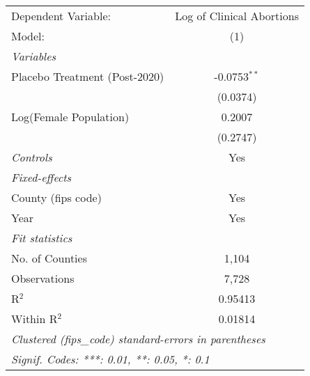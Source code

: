 \begingroup
\centering
\begin{tabular}{lc}
   \tabularnewline \midrule \midrule
   Dependent Variable:           & Log of Clinical Abortions\\   
   Model:                        & (1)\\  
   \midrule
   \emph{Variables}\\
   Placebo Treatment (Post-2020) & -0.0753$^{**}$\\   
                                 & (0.0374)\\   
   Log(Female Population)        & 0.2007\\   
                                 & (0.2747)\\   
   \midrule
   \emph{Controls}               & Yes\\
   \midrule
   \emph{Fixed-effects}\\
   County (fips code)            & Yes\\
   Year                          & Yes\\
   \midrule
   \emph{Fit statistics}\\
   No. of Counties               & 1,104\\
   Observations                  & 7,728\\  
   R$^2$                         & 0.95413\\  
   Within R$^2$                  & 0.01814\\  
   \midrule \midrule
   \multicolumn{2}{l}{\emph{Clustered (fips\_code) standard-errors in parentheses}}\\
   \multicolumn{2}{l}{\emph{Signif. Codes: ***: 0.01, **: 0.05, *: 0.1}}\\
\end{tabular}
\par\endgroup